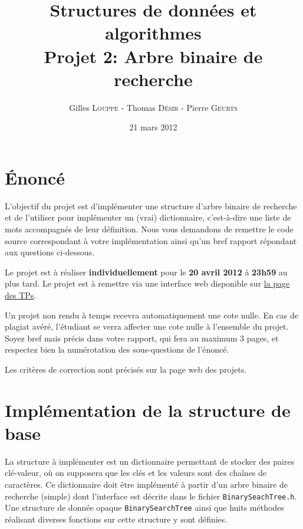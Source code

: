 \documentclass[a4paper,10pt]{article}
\title{
    \textbf{Structures de données et algorithmes}\\
    Projet 2: Arbre binaire de recherche
}
\author{Gilles \textsc{Louppe} - Thomas \textsc{Désir} - Pierre \textsc{Geurts}}
\date{21 mars 2012}
\begin{document}
\maketitle

\section*{\'Enoncé}

L'objectif du projet est d'implémenter une structure d'arbre binaire
de recherche et de l'utiliser pour implémenter un (vrai) dictionnaire,
c'est-à-dire une liste de mots accompagnés de leur définition. Nous
vous demandons de remettre le code source correspondant à votre
implémentation ainsi qu'un bref rapport répondant aux questions
ci-dessous.

Le projet est à réaliser {\bf individuellement} pour le {\bf 20 avril
  2012} à {\bf 23h59} au plus tard. Le projet est à
remettre via une interface web disponible sur
\href{http://www.montefiore.ulg.ac.be/~glouppe/2011-2012/students.info0902.php}{la
  page des TPs}.

Un projet non rendu à temps recevra automatiquement une cote nulle. En
cas de plagiat avéré, l'étudiant se verra affecter une cote nulle à
l'ensemble du projet. Soyez bref mais précis dans votre rapport, qui
fera au maximum 3 pages, et respectez bien la numérotation des
sous-questions de l'énoncé.

Les critères de correction sont précisés sur la page web des projets.

\section{Implémentation de la structure de base}

La structure à implémenter est un dictionnaire permettant de stocker
des paires clé-valeur, où on supposera que les clés et les valeurs
sont des chaînes de caractères. Ce dictionnaire doit être implémenté à
partir d'un arbre binaire de recherche (simple) dont l'interface est
décrite dans le fichier \texttt{BinarySeachTree.h}. Une structure de
donnée opaque \texttt{BinarySearchTree} ainsi que huits méthodes
réalisant diverses fonctions sur cette structure y sont définies.
\end{document}
